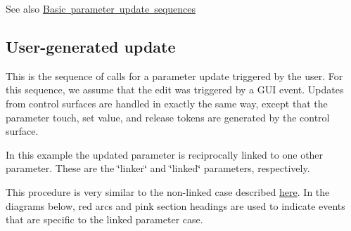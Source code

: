 \begin{DoxySeeAlso}{See also}
\mbox{\hyperlink{a00823}{Basic parameter update sequences}}
\end{DoxySeeAlso}
\hypertarget{a00825_linkedParameters_sequences_user_gui}{}\subsection{User-\/generated update}\label{a00825_linkedParameters_sequences_user_gui}
This is the sequence of calls for a parameter update triggered by the user. For this sequence, we assume that the edit was triggered by a G\+UI event. Updates from control surfaces are handled in exactly the same way, except that the parameter touch, set value, and release tokens are generated by the control surface.

In this example the updated parameter is reciprocally linked to one other parameter. These are the \char`\"{}linker\char`\"{} and \char`\"{}linked\char`\"{} parameters, respectively.

This procedure is very similar to the non-\/linked case described \mbox{\hyperlink{a00823_parameterUpdates_sequences_user}{here}}. In the diagrams below, red arcs and pink section headings are used to indicate events that are specific to the linked parameter case.

